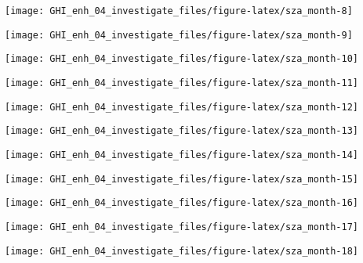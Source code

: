 \documentclass[
  10pt,
  a4paper,oneside]{article}
\begin{document}
\begin{center}\texttt{[image: GHI\_enh\_04\_investigate\_files/figure-latex/sza\_month-8]} \end{center}

\begin{center}\texttt{[image: GHI\_enh\_04\_investigate\_files/figure-latex/sza\_month-9]} \end{center}

\begin{center}\texttt{[image: GHI\_enh\_04\_investigate\_files/figure-latex/sza\_month-10]} \end{center}

\begin{center}\texttt{[image: GHI\_enh\_04\_investigate\_files/figure-latex/sza\_month-11]} \end{center}

\begin{center}\texttt{[image: GHI\_enh\_04\_investigate\_files/figure-latex/sza\_month-12]} \end{center}

\begin{center}\texttt{[image: GHI\_enh\_04\_investigate\_files/figure-latex/sza\_month-13]} \end{center}

\begin{center}\texttt{[image: GHI\_enh\_04\_investigate\_files/figure-latex/sza\_month-14]} \end{center}

\begin{center}\texttt{[image: GHI\_enh\_04\_investigate\_files/figure-latex/sza\_month-15]} \end{center}

\begin{center}\texttt{[image: GHI\_enh\_04\_investigate\_files/figure-latex/sza\_month-16]} \end{center}

\begin{center}\texttt{[image: GHI\_enh\_04\_investigate\_files/figure-latex/sza\_month-17]} \end{center}

\begin{center}\texttt{[image: GHI\_enh\_04\_investigate\_files/figure-latex/sza\_month-18]} \end{center}
\end{document}
